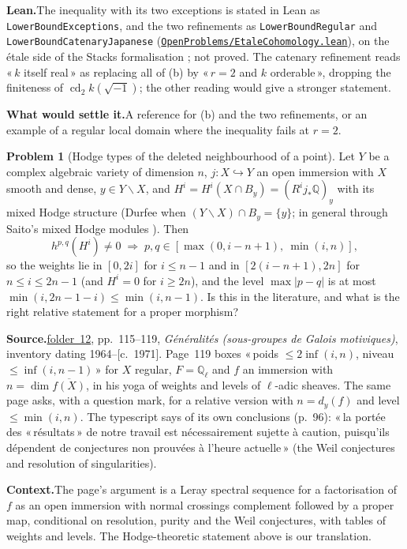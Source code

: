 \documentclass[11pt]{article}
\newcommand{\q}[1]{«\,#1\,»}
\newcommand{\fac}[1]{\href{https://grothendieck.umontpellier.fr/#1.pdf}{folder~#1}}
\newcommand{\cd}{\operatorname{cd}}
\theoremstyle{definition}
\newtheorem{problem}{Problem}
\theoremstyle{plain}\newtheorem*{proposition}{Proposition}\theoremstyle{definition}
\newcommand{\entry}[1]{\par\medskip\noindent\textbf{#1}\enspace}
\newcommand{\src}[1]{\entry{Source.}#1}
\newcommand{\ctx}{\entry{Context.}}
\newcommand{\leanst}{\entry{Lean.}}
\newcommand{\leanop}[1]{\href{https://github.com/Commutator-IO/GrothendieckArchivesProofs/blob/main/OpenProblems/#1.lean}{\nolinkurl{OpenProblems/#1.lean}}}
\newcommand{\settle}{\entry{What would settle it.}}
\begin{document}
\leanst The inequality with its two exceptions is stated in Lean as \texttt{LowerBoundExceptions}, and the two refinements as \texttt{LowerBoundRegular} and \texttt{LowerBoundCatenaryJapanese} (\leanop{EtaleCohomology}), on the étale side of the Stacks formalisation \cite{axiomstacks}; not proved. The catenary refinement reads \q{$k$ itself real} as replacing all of (b) by \q{$r = 2$ and $k$ orderable}, dropping the finiteness of $\cd_2 k(\sqrt{-1})$; the other reading would give a stronger statement.

\settle A reference for (b) and the two refinements, or an example of a regular local domain where the inequality fails at $r = 2$.

\begin{problem}[Hodge types of the deleted neighbourhood of a point]\label{p:box}
Let $Y$ be a complex algebraic variety of dimension $n$, $j : X \hookrightarrow Y$ an open immersion with $X$ smooth and dense, $y \in Y \smallsetminus X$, and $H^i = H^i(X \cap B_y) = (R^i j_*\mathbb Q)_y$ with its mixed Hodge structure (Durfee \cite{durfee} when $(Y \smallsetminus X) \cap B_y = \{y\}$; in general through Saito's mixed Hodge modules \cite{saito}). Then
\[
h^{p,q}(H^i) \ne 0 \;\Longrightarrow\; p, q \in [\max(0, i-n+1),\ \min(i, n)],
\]
so the weights lie in $[0, 2i]$ for $i \le n-1$ and in $[2(i-n+1), 2n]$ for $n \le i \le 2n-1$ (and $H^i = 0$ for $i \ge 2n$), and the level $\max|p-q|$ is at most $\min(i, 2n-1-i) \le \min(i, n-1)$. Is this in the literature, and what is the right relative statement for a proper morphism?
\end{problem}

\src{\fac{12}, pp.~115--119, \emph{Généralités (sous-groupes de Galois motiviques)}, inventory dating 1964--[c.~1971]. Page~119 boxes \q{poids $\le 2\inf(i,n)$, niveau $\le \inf(i, n-1)$} for $X$ regular, $F = \mathbb Q_\ell$ and $f$ an immersion with $n = \dim \overline{f(X)}$, in his yoga of weights and levels of $\ell$-adic sheaves. The same page asks, with a question mark, for a relative version with $n = d_y(f)$ and level $\le \min(i,n)$. The typescript says of its own conclusions (p.~96): \q{la portée des \q{résultats} de notre travail est nécessairement sujette à caution, puisqu'ils dépendent de conjectures non prouvées à l'heure actuelle} (the Weil conjectures and resolution of singularities).}

\ctx The page's argument is a Leray spectral sequence for a factorisation of $f$ as an open immersion with normal crossings complement followed by a proper map, conditional on resolution, purity and the Weil conjectures, with tables of weights and levels. The Hodge-theoretic statement above is our translation.
\end{document}
